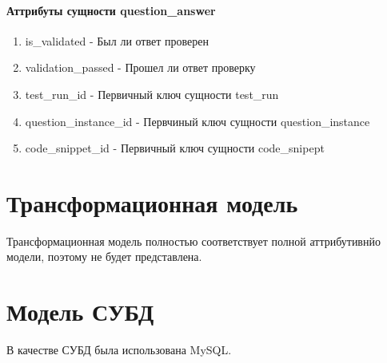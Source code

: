 \documentclass{article}
\begin{document}
\paragraph{Аттрибуты сущности question\_answer}
\begin{enumerate}
	\item is\_validated - Был ли ответ проверен
	\item validation\_passed - Прошел ли ответ проверку
	\item test\_run\_id - Первичный ключ сущности test\_run
	\item question\_instance\_id - Первчиный ключ сущности question\_instance 
	\item code\_snippet\_id - Первичный ключ сущности code\_snipept
\end{enumerate}


\section{Трансформационная модель}
Трансформационная модель полностью соответствует полной
аттрибутивнйо модели, поэтому не будет представлена.


\section{Модель СУБД}
В качестве СУБД была использована MySQL.
\end{document}
